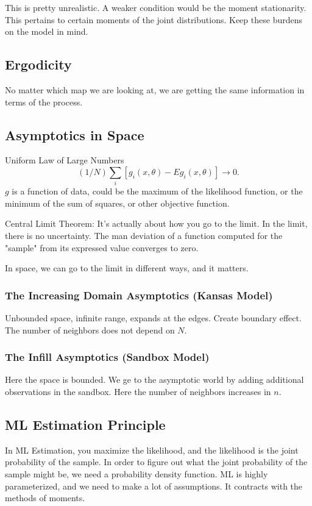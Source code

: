 \documentclass[11pt,a4paper]{amsart}
\theoremstyle{plain}
\theoremstyle{definition}
\begin{document}
This is pretty unrealistic. A weaker condition would be the moment stationarity. This pertains to certain moments of the joint distributions. Keep these burdens on the model in mind. 

\subsection{Ergodicity}
 No matter which map we are looking at, we are getting the same information in terms of the process. 

\subsection{Asymptotics in Space}\hfill\par 
Uniform Law of Large Numbers
\[	(1/N)\sum_{i}[g_{i}(x, \theta) - Eg_{i}(x, \theta)] \rightarrow 0.	\]
$g$ is a function of data, could be the maximum of the likelihood function, or the minimum of the sum of squares, or other objective function.

Central Limit Theorem: It's actually about how you go to the limit. In the limit, there is no uncertainty. The man deviation of a function computed for the "sample" from its expressed value converges to zero.  

In space, we can go to the limit in different ways, and it matters. 
\subsubsection{The Increasing Domain Asymptotics (Kansas Model)}\hfill\par 
Unbounded space, infinite range, expands at the edges. Create boundary effect. The number of neighbors does not depend on $N$.
\subsubsection{The Infill Asymptotics (Sandbox Model)}\hfill\par 
Here the space is bounded. We ge to the asymptotic world by adding additional observations in the sandbox. Here the number of neighbors increases in $n$. 

\subsection{ML Estimation Principle}\hfill\par 
In ML Estimation, you maximize the likelihood, and the likelihood is the  joint probability of the sample. In order to figure out what the joint probability of the sample might be, we need a probability density function. ML is highly parameterized, and we need to make a lot of assumptions. It contracts with the methods of moments. 
\end{document}
